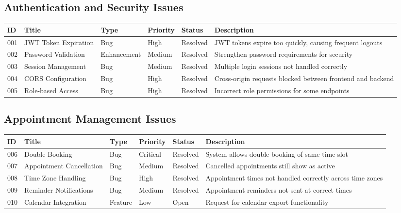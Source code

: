 \documentclass[12pt,a4paper]{article}
\begin{document}
\subsection{Authentication and Security Issues}

\begin{longtable}{|p{0.8cm}|p{2.5cm}|p{1.5cm}|p{1.5cm}|p{1.5cm}|p{4.2cm}|}
\hline
\textbf{ID} & \textbf{Title} & \textbf{Type} & \textbf{Priority} & \textbf{Status} & \textbf{Description} \\
\hline
001 & JWT Token Expiration & Bug & High & Resolved & JWT tokens expire too quickly, causing frequent logouts \\
\hline
002 & Password Validation & Enhancement & Medium & Resolved & Strengthen password requirements for security \\
\hline
003 & Session Management & Bug & Medium & Resolved & Multiple login sessions not handled correctly \\
\hline
004 & CORS Configuration & Bug & High & Resolved & Cross-origin requests blocked between frontend and backend \\
\hline
005 & Role-based Access & Bug & High & Resolved & Incorrect role permissions for some endpoints \\
\hline
\end{longtable}

\subsection{Appointment Management Issues}

\begin{longtable}{|p{0.8cm}|p{2.5cm}|p{1.5cm}|p{1.5cm}|p{1.5cm}|p{4.2cm}|}
\hline
\textbf{ID} & \textbf{Title} & \textbf{Type} & \textbf{Priority} & \textbf{Status} & \textbf{Description} \\
\hline
006 & Double Booking & Bug & Critical & Resolved & System allows double booking of same time slot \\
\hline
007 & Appointment Cancellation & Bug & Medium & Resolved & Cancelled appointments still show as active \\
\hline
008 & Time Zone Handling & Bug & High & Resolved & Appointment times not handled correctly across time zones \\
\hline
009 & Reminder Notifications & Bug & Medium & Resolved & Appointment reminders not sent at correct times \\
\hline
010 & Calendar Integration & Feature & Low & Open & Request for calendar export functionality \\
\hline
\end{longtable}
\end{document}
